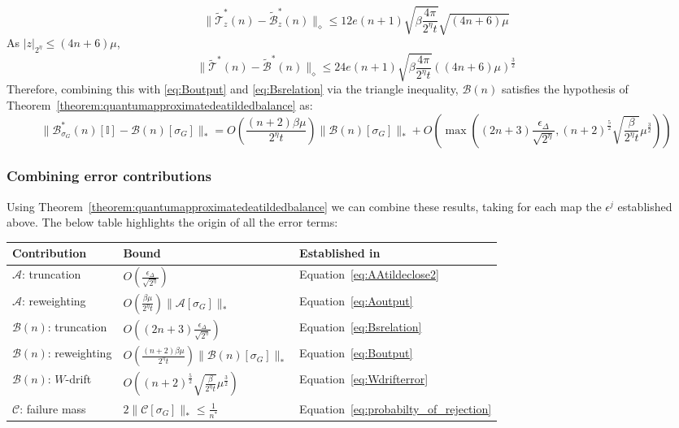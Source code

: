 \documentclass[aps,floatfix,10pt,amssymb,amsfont,amsmath,superscriptaddress,float,nofootinbib,longbibliography,nobalancelastpage,twocolumn]{revtex4-2}
\begin{document}
\begin{widetext}
\begin{equation}
    \|\tilde{\mathcal{T}}_z^*(n) - \tilde{\mathcal{B}}_z^*(n)\|_{\diamond} \leq 12e(n+1)\sqrt{\beta\frac{4\pi}{2^{\eta}t}}\sqrt{(4n+6)\mu}
\end{equation}
As $|z|_{2^{\eta}} \leq (4n+6)\mu$,
\begin{equation}
    \|\tilde{\mathcal{T}}^*(n) - \tilde{\mathcal{B}}^*(n)\|_{\diamond} \leq 24e(n+1)\sqrt{\beta\frac{4\pi}{2^{\eta}t}}((4n+6)\mu)^{\frac{3}{2}}
    \label{eq:Wdrifterror}
\end{equation}
Therefore, combining this with \eqref{eq:Boutput} and \eqref{eq:Bsrelation} via the triangle inequality, $\mathcal{B}(n)$ satisfies the hypothesis of Theorem~\ref{theorem:quantumapproximatedeatildedbalance} as:
\begin{equation}
    \|\mathcal{B}^*_{\sigma_G}(n)[\mathbb{I}] - \mathcal{B}(n)[\sigma_G]\|_* = O\left(\frac{(n+2)\beta\mu}{2^{\eta}t} \right)\|\mathcal{B}(n)[\sigma_G]\|_* +O\left(\max\left((2n+3)\frac{\epsilon_{\Delta}}{\sqrt{2^{\eta}}},(n+2)^{\frac{5}{2}}\sqrt{\frac{\beta }{2^{\eta}t}}\mu^{\frac{3}{2}}\right)\right) 
\end{equation}
\subsubsection{Combining error contributions}
Using Theorem~\ref{theorem:quantumapproximatedeatildedbalance} we can combine these results, taking for each map the $\epsilon^j$ established above. The below table highlights the origin of all the error terms:
\begin{center}
\begin{tabular}{lll}
\hline\hline
Contribution & Bound & Established in \\
\hline
$\mathcal{A}$: truncation & $O(\frac{\epsilon_{\Delta}}{\sqrt{2^{\eta}}})$ &
Equation~\eqref{eq:AAtildeclose2} \\
$\mathcal{A}$: reweighting &  $O(\frac{\beta\mu}{2^{\eta}t})\|\mathcal{A}[\sigma_G]\|_*$ & Equation~\eqref{eq:Aoutput} \\
$\mathcal{B}(n)$: truncation  & $O((2n+3)\frac{\epsilon_{\Delta}}{\sqrt{2^{\eta}}})$ & Equation~\eqref{eq:Bsrelation} \\
$\mathcal{B}(n)$: reweighting & $O(\frac{(n+2)\beta\mu}{2^{\eta}t})\|\mathcal{B}(n)[\sigma_G]\|_*$ &  Equation~\eqref{eq:Boutput}\\
$\mathcal{B}(n)$: $W$-drift  & $O((n+2)^{\frac{5}{2}}\sqrt{\frac{\beta}{2^{\eta}t}}\mu^{\frac{3}{2}})$ & Equation~\eqref{eq:Wdrifterror}\\
$\mathcal{C}$: failure mass & $2\|\mathcal{C}[\sigma_G]\|_* \leq \frac{1}{n^*}$ & Equation~\eqref{eq:probabilty_of_rejection} \\
\hline\hline
\end{tabular}
\end{center}



\end{widetext}
\end{document}
